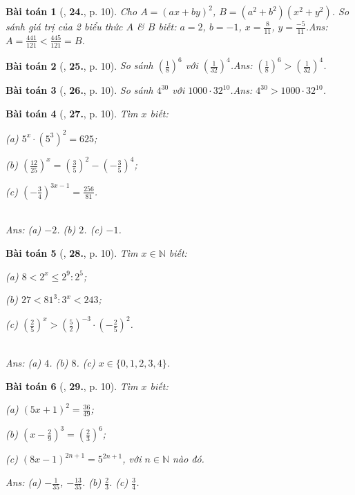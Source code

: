 \documentclass{article}
\numberwithin{equation}{section}
\newtheorem{baitoan}{Bài toán}
\begin{document}
\begin{baitoan}[\cite{Tuyen_Toan_7}, \textbf{24.}, p. 10]
	Cho $A = (ax + by)^2$, $B = (a^2 + b^2)(x^2 + y^2)$. So sánh giá trị của 2 biểu thức $A$ \& $B$ biết: $a = 2$, $b = -1$, $x = \frac{8}{11}$, $y = \frac{-5}{11}$.\hfill\textsf{Ans:} $A = \frac{441}{121} < \frac{445}{121} = B$.
\end{baitoan}

\begin{baitoan}[\cite{Tuyen_Toan_7}, \textbf{25.}, p. 10]
	So sánh $\left(\frac{1}{8}\right)^6$ với $\left(\frac{1}{32}\right)^4$.\hfill\textsf{Ans:} $\left(\frac{1}{8}\right)^6 > \left(\frac{1}{32}\right)^4$.
\end{baitoan}

\begin{baitoan}[\cite{Tuyen_Toan_7}, \textbf{26.}, p. 10]
	So sánh $4^{30}$ với $1000\cdot 32^{10}$.\hfill\textsf{Ans:} $4^{30} > 1000\cdot 32^{10}$.
\end{baitoan}

\begin{baitoan}[\cite{Tuyen_Toan_7}, \textbf{27.}, p. 10]
	Tìm $x$ biết:
	\begin{enumerate*}
		\item[(a)] $5^x\cdot(5^3)^2 = 625$;
		\item[(b)] $\left(\frac{12}{25}\right)^x = \left(\frac{3}{5}\right)^2 - \left(-\frac{3}{5}\right)^4$;
		\item[(c)] $\left(-\frac{3}{4}\right)^{3x - 1} = \frac{256}{81}$.
	\end{enumerate*}\\\mbox{}\hfill\textsf{Ans:} (a) $-2$. (b) $2$. (c) $-1$.
\end{baitoan}

\begin{baitoan}[\cite{Tuyen_Toan_7}, \textbf{28.}, p. 10]
	Tìm $x\in\mathbb{N}$ biết:
	\begin{enumerate*}
		\item[(a)] $8 < 2^x\le 2^9:2^5$;
		\item[(b)] $27 < 81^3:3^x < 243$;
		\item[(c)] $\left(\frac{2}{5}\right)^x > \left(\frac{5}{2}\right)^{-3}\cdot\left(-\frac{2}{5}\right)^2$.
	\end{enumerate*}\\\mbox{}\hfill\textsf{Ans:} (a) $4$. (b) $8$. (c) $x\in\{0,1,2,3,4\}$.
\end{baitoan}

\begin{baitoan}[\cite{Tuyen_Toan_7}, \textbf{29.}, p. 10]
	Tìm $x$ biết:
	\begin{enumerate*}
		\item[(a)] $(5x + 1)^2 = \frac{36}{49}$;
		\item[(b)] $\left(x - \frac{2}{9}\right)^3 = \left(\frac{2}{3}\right)^6$;
		\item[(c)] $(8x - 1)^{2n + 1} = 5^{2n + 1}$, với $n\in\mathbb{N}$ nào đó.
	\end{enumerate*}\hfill\textsf{Ans:} (a) $-\frac{1}{35}$, $-\frac{13}{35}$. (b) $\frac{2}{3}$. (c) $\frac{3}{4}$.
\end{baitoan}
\end{document}
